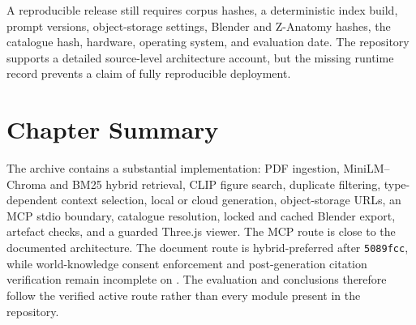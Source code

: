 A reproducible release still requires corpus hashes, a deterministic index build, prompt versions, object-storage settings, Blender and Z-Anatomy hashes, the catalogue hash, hardware, operating system, and evaluation date. The repository supports a detailed source-level architecture account, but the missing runtime record prevents a claim of fully reproducible deployment.

\section{Chapter Summary}
\label{sec:implementation-summary}

The archive contains a substantial implementation: PDF ingestion, MiniLM--Chroma and BM25 hybrid retrieval, CLIP figure search, duplicate filtering, type-dependent context selection, local or cloud generation, object-storage URLs, an MCP stdio boundary, catalogue resolution, locked and cached Blender export, artefact checks, and a guarded Three.js viewer. The MCP route is close to the documented architecture. The document route is hybrid-preferred after \texttt{5089fcc}, while world-knowledge consent enforcement and post-generation citation verification remain incomplete on . The evaluation and conclusions therefore follow the verified active route rather than every module present in the repository.
